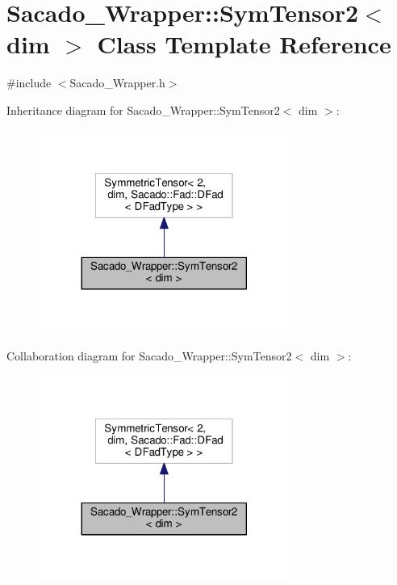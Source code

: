 \hypertarget{classSacado__Wrapper_1_1SymTensor2}{}\section{Sacado\+\_\+\+Wrapper\+:\+:Sym\+Tensor2$<$ dim $>$ Class Template Reference}
\label{classSacado__Wrapper_1_1SymTensor2}


{\ttfamily \#include $<$Sacado\+\_\+\+Wrapper.\+h$>$}



Inheritance diagram for Sacado\+\_\+\+Wrapper\+:\+:Sym\+Tensor2$<$ dim $>$\+:
\nopagebreak
\begin{figure}[H]
\begin{center}
\leavevmode
\includegraphics[width=233pt]{classSacado__Wrapper_1_1SymTensor2__inherit__graph}
\end{center}
\end{figure}


Collaboration diagram for Sacado\+\_\+\+Wrapper\+:\+:Sym\+Tensor2$<$ dim $>$\+:
\nopagebreak
\begin{figure}[H]
\begin{center}
\leavevmode
\includegraphics[width=233pt]{classSacado__Wrapper_1_1SymTensor2__coll__graph}
\end{center}
\end{figure}
